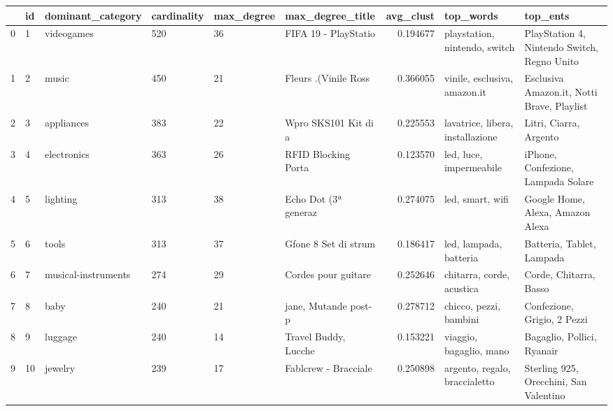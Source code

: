 \begin{tabular}{llllllrll}
\toprule
{} &  id &    dominant\_category & cardinality & max\_degree &      max\_degree\_title &  avg\_clust &                         top\_words &                                     top\_ents \\
\midrule
0 &   1 &           videogames &         520 &         36 &  FIFA 19 - PlayStatio &   0.194677 &     playstation, nintendo, switch &  PlayStation 4, Nintendo Switch, Regno Unito \\
1 &   2 &                music &         450 &         21 &  Fleurs .(Vinile Ross &   0.366055 &      vinile, esclusiva, amazon.it &   Esclusiva Amazon.it, Notti Brave, Playlist \\
2 &   3 &           appliances &         383 &         22 &  Wpro SKS101 Kit di a &   0.225553 &  lavatrice, libera, installazione &                       Litri, Ciarra, Argento \\
3 &   4 &          electronics &         363 &         26 &  RFID Blocking Porta  &   0.123570 &           led, luce, impermeabile &           iPhone, Confezione, Lampada Solare \\
4 &   5 &             lighting &         313 &         38 &  Echo Dot (3ª generaz &   0.274075 &                  led, smart, wifi &             Google Home, Alexa, Amazon Alexa \\
5 &   6 &                tools &         313 &         37 &  Gfone 8 Set di strum &   0.186417 &            led, lampada, batteria &                    Batteria, Tablet, Lampada \\
6 &   7 &  musical-instruments &         274 &         29 &  Cordes pour guitare  &   0.252646 &         chitarra, corde, acustica &                       Corde, Chitarra, Basso \\
7 &   8 &                 baby &         240 &         21 &  jane, Mutande post-p &   0.278712 &            chicco, pezzi, bambini &                  Confezione, Grigio, 2 Pezzi \\
8 &   9 &              luggage &         240 &         14 &  Travel Buddy, Lucche &   0.153221 &           viaggio, bagaglio, mano &                   Bagaglio, Pollici, Ryanair \\
9 &  10 &              jewelry &         239 &         17 &  Fablcrew - Bracciale &   0.250898 &     argento, regalo, braccialetto &       Sterling 925, Orecchini, San Valentino \\
\bottomrule
\end{tabular}
